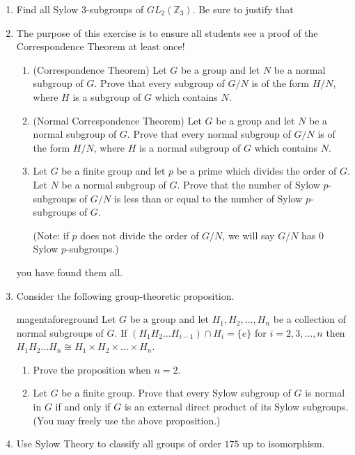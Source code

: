 \documentclass[notoc,notitlepage,nobib]{tufte-book}
\begin{document}
\begin{enumerate}
  \item Find all Sylow $3$-subgroups of $GL_2(\mathbb{Z}_3)$. Be sure to justify that
  \item The purpose of this exercise is to ensure all students see a proof of the
    Correspondence Theorem at least once!
    \begin{enumerate}
      \item (Correspondence Theorem) Let $G$ be a group and let $N$ be a normal
        subgroup of $G$. Prove that every subgroup of $G / N$ is of the form
        $H / N$, where $H$ is a subgroup of $G$ which contains $N$.
      \item (Normal Correspondence Theorem) Let $G$ be a group and let $N$ be a
        normal subgroup of $G$. Prove that every normal subgroup of $G / N$ is
        of the form $H / N$, where $H$ is a normal subgroup of $G$ which contains 
        $N$.
      \item Let $G$ be a finite group and let $p$ be a prime which divides the
        order of $G$. Let $N$ be a normal subgroup of $G$. Prove that the number
        of Sylow $p$-subgroups of $G / N$ is less than or equal to the number of
        Sylow $p$-subgroups of $G$.

        (Note: if $p$ does not divide the order of $G / N$, we will say $G / N$ has
        $0$ Sylow $p$-subgroups.)
    \end{enumerate}
    you have found them all.
  \item Consider the following group-theoretic proposition.
    \begin{quotebox}{magenta}{foreground}
      Let $G$ be a group and let $H_1, H_2, \ldots, H_n$ be a collection of normal
      subgroups of $G$. If $(H_1 H_2 \hdots H_{i - 1}) \cap H_i = \{ e \}$ for
      $i = 2, 3, \ldots, n$ then 
      $H_1 H_2 \hdots H_n \cong H_1 \times H_2 \times \hdots \times H_n$.
    \end{quotebox}
    \begin{enumerate}
      \item Prove the proposition when $n = 2$.
      \item Let $G$ be a finite group. Prove that every Sylow subgroup of $G$ is
        normal in $G$ if and only if $G$ is an external direct product of its
        Sylow subgroups.  (You may freely use the above proposition.)
    \end{enumerate}
  \item Use Sylow Theory to classify all groups of order $175$ up to isomorphism.
\end{enumerate}
\end{document}
